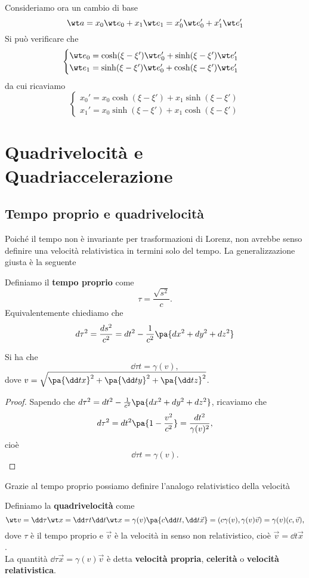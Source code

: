 \noindent
Consideriamo ora un cambio di base
\[\wt a=x_0\wt e_0+x_1\wt e_1=x_0'\wt e_0'+x_1'\wt e_1'\]
Si pu\`o verificare che
\[\begin{cases}
\wt e_0=\cosh(\xi-\xi')\wt e_0'+\sinh(\xi-\xi')\wt e_1'\\
\wt e_1=\sinh(\xi-\xi')\wt e_0'+\cosh(\xi-\xi')\wt e_1'
\end{cases}\]
da cui ricaviamo
\[\begin{cases}
x_0'=x_0\cosh(\xi-\xi')+x_1\sinh(\xi-\xi')\\
x_1'=x_0\sinh(\xi-\xi')+x_1\cosh(\xi-\xi')
\end{cases}\]


\section{Quadrivelocit\`a e Quadriaccelerazione}
\subsection{Tempo proprio e quadrivelocit\`a}
Poich\'e il tempo non \`e invariante per trasformazioni di Lorenz, non avrebbe senso definire una velocit\`a relativistica in termini solo del tempo. La generalizzazione giusta \`e la seguente

\begin{definition}
Definiamo il \textbf{tempo proprio} come
\[\tau=\frac{\sqrt{s^2}}c.\]
Equivalentemente chiediamo che
\[d\tau^2=\frac{ds^2}{c^2}=dt^2-\frac1{c^2}\pa{dx^2+dy^2+dz^2}\]
\end{definition}

\begin{proposition}\label{DerivataTempoPerTempoProprio}
Si ha che
\[\dd \tau t=\gamma(v),\]
dove $v=\sqrt{\pa{\dd tx}^2+\pa{\dd ty}^2+\pa{\dd tz}^2}$.
\end{proposition}
\begin{proof}
Sapendo che $d\tau^2=dt^2-\frac1{c^2}\pa{dx^2+dy^2+dz^2}$, ricaviamo che
\[d\tau^2=dt^2\pa{1-\frac{v^2}{c^2}}=\frac{dt^2}{\gamma(v)^2},\]
cio\`e
\[\dd \tau t=\gamma(v).\]
\end{proof}

\noindent Grazie al tempo proprio possiamo definire l'analogo relativistico della velocit\`a

\begin{definition}[Quadrivelocit\`a]
Definiamo la \textbf{quadrivelocit\`a} come
\[\wt v=\dd \tau{\wt x}=\dd \tau t\dd t{\wt x}=\gamma(v)\pa{c\dd tt,\dd t{\vec x}}=(c\gamma(v),\gamma(v)\vec v)=\gamma(v)(c,\vec v),\]
dove $\tau$ \`e il tempo proprio e $\vec v$ \`e la velocit\`a in senso non relativistico, cio\`e $\vec v=\dd t{\vec x}$.\\
La quantit\`a $\dd \tau{\vec x}=\gamma(v)\vec v$ \`e detta \textbf{velocit\`a propria}, \textbf{celerit\`a} o \textbf{velocit\`a relativistica}.
\end{definition}

